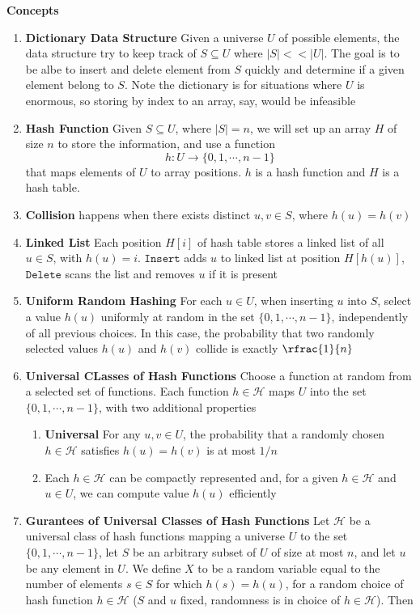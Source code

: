 \documentclass[11pt]{article}
\begin{document}
\begin{defn*}
    \textbf{Concepts}
    \begin{enumerate}
        \item \textbf{Dictionary Data Structure} Given a universe $U$ of possible elements, the data structure try to keep track of $S\subseteq U$ where $|S| << |U|$. The goal is to be albe to insert and delete element from $S$ quickly and determine if a given element belong to $S$. Note the dictionary is for situations where $U$ is enormous, so storing by index to an array, say, would be infeasible
        \item \textbf{Hash Function} Given $S\subseteq U$, where $|S| = n$, we will set up an array $H$ of size $n$ to store the information, and use a function 
        \[
            h: U\rightarrow \{0,1,\cdots,n-1 \}    
        \]
        that maps elements of $U$ to array positions. $h$ is a hash function and $H$ is a hash table.
        \item \textbf{Collision} happens when there exists distinct $u,v\in S$, where $h(u)=h(v)$
        \item \textbf{Linked List} Each position $H[i]$ of hash table stores a linked list of all $u\in S$, with $h(u)=i$. $\texttt{Insert}$ adds $u$ to linked list at position $H[h(u)]$, $\texttt{Delete}$ scans the list and removes $u$ if it is present
        \item \textbf{Uniform Random Hashing} For each $u\in U$, when inserting $u$ into $S$, select a value $h(u)$ uniformly at random in the set $\{0,1,\cdots,n-1\}$, independently of all previous choices. In this case, the probability that two randomly selected values $h(u)$ and $h(v)$ collide is exactly $\rfrac{1}{n}$
        \item \textbf{Universal CLasses of Hash Functions} Choose a function at random from a selected set of functions. Each function $h \in \mathcal{H}$ maps $U$ into the set $\{0,1,\cdots, n-1\}$, with two additional properties 
        \begin{enumerate}
            \item \textbf{Universal} For any $u,v\in U$, the probability that a randomly chosen $h\in \mathcal{H}$ satisfies $h(u)=h(v)$ is at most $1/n$
            \item Each $h\in \mathcal{H}$ can be compactly represented and, for a given $h\in \mathcal{H}$ and $u\in U$, we can compute value $h(u)$ efficiently
        \end{enumerate}
        \item \textbf{Gurantees of Universal Classes of Hash Functions} Let $\mathcal{H}$ be a universal class of hash functions mapping a universe $U$ to the set $\{0,1,\cdots,n-1\}$, let $S$ be an arbitrary subset of $U$ of size at most $n$, and let $u$ be any element in $U$. We define $X$ to be a random variable equal to the number of elements $s\in S$ for which $h(s)=h(u)$, for a random choice of hash function $h\in \mathcal{H}$ ($S$ and $u$ fixed, randomness is in choice of $h\in \mathcal{H}$). Then 

\end{enumerate}
\end{defn*}
\end{document}

